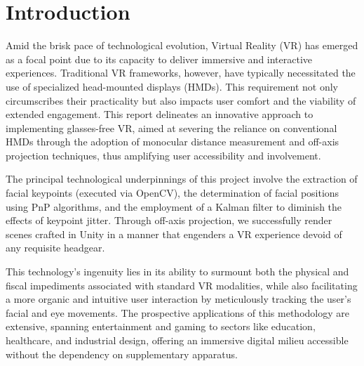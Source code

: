 \section {Introduction}
Amid the brisk pace of technological evolution, Virtual Reality (VR) has emerged as a focal point due to its capacity to deliver immersive and interactive experiences. Traditional VR frameworks, however, have typically necessitated the use of specialized head-mounted displays (HMDs). This requirement not only circumscribes their practicality but also impacts user comfort and the viability of extended engagement. This report delineates an innovative approach to implementing glasses-free VR, aimed at severing the reliance on conventional HMDs through the adoption of monocular distance measurement and off-axis projection techniques, thus amplifying user accessibility and involvement.

The principal technological underpinnings of this project involve the extraction of facial keypoints (executed via OpenCV), the determination of facial positions using PnP algorithms, and the employment of a Kalman filter to diminish the effects of keypoint jitter. Through off-axis projection, we successfully render scenes crafted in Unity in a manner that engenders a VR experience devoid of any requisite headgear.

This technology's ingenuity lies in its ability to surmount both the physical and fiscal impediments associated with standard VR modalities, while also facilitating a more organic and intuitive user interaction by meticulously tracking the user’s facial and eye movements. The prospective applications of this methodology are extensive, spanning entertainment and gaming to sectors like education, healthcare, and industrial design, offering an immersive digital milieu accessible without the dependency on supplementary apparatus.

